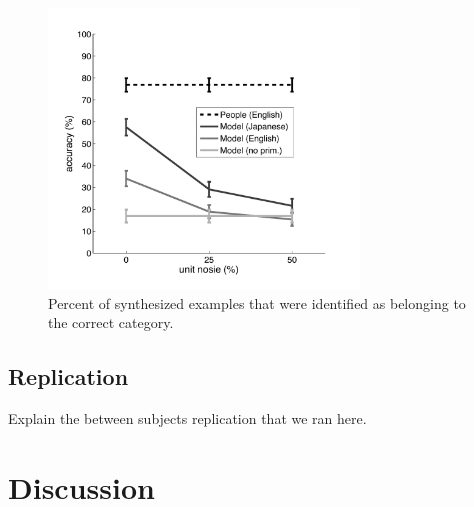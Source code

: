 \documentclass[10pt,letterpaper]{article}
\begin{document}
\begin{figure}[h]
\centering
\includegraphics[width=3.25in]{gen_results.pdf}
\caption{Percent of synthesized examples that were identified as belonging to the correct category.}
\label{gen_results}
\end{figure}

\subsection{Replication}
Explain the between subjects replication that we ran here.

\section{Discussion}


\setlength{\bibleftmargin}{.125in}
\setlength{\bibindent}{-\bibleftmargin}


\end{document}
